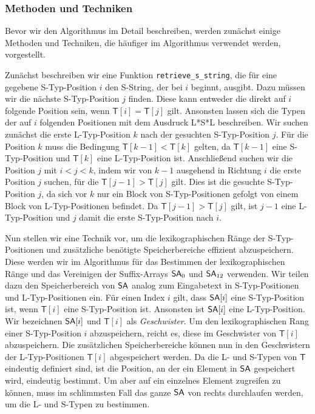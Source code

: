 \subsubsection{Methoden und Techniken}
\label{nzSufSort:intro:methods}

Bevor wir den Algorithmus im Detail beschreiben, werden zunächst einige Methoden und Techniken, die häufiger im Algorithmus verwendet werden, vorgestellt. \par
Zunächst beschreiben wir eine Funktion \texttt{retrieve\_s\_string}, die für eine gegebene S-Typ-Position $i$ den S-String, der bei $i$ beginnt, ausgibt. Dazu müssen wir die nächste S-Typ-Position $j$ finden. Diese kann entweder die direkt auf $i$ folgende Position sein, wenn $\mathsf{T}[i]=\mathsf{T}[j]$ gilt. Ansonsten lassen sich die Typen der auf $i$ folgenden Positionen mit dem Ausdruck L*S*L beschreiben. Wir suchen zunächst die erste L-Typ-Position $k$ nach der gesuchten S-Typ-Position $j$. Für die Position $k$ muss die Bedingung $\mathsf{T}[k-1] < \mathsf{T}[k]$ gelten, da $\mathsf{T}[k-1]$ eine S-Typ-Position und $\mathsf{T}[k]$ eine L-Typ-Position ist. Anschließend suchen wir die Position $j$ mit $i < j < k$, indem wir von $k-1$ ausgehend in Richtung $i$ die erste Position $j$ suchen, für die $\mathsf{T}[j-1] > \mathsf{T}[j]$ gilt. Dies ist die gesuchte S-Typ-Position $j$, da sich vor $k$ nur ein Block von S-Typ-Positionen gefolgt von einem Block von L-Typ-Positionen befindet. Da $\mathsf{T}[j-1] > \mathsf{T}[j]$ gilt, ist $j-1$ eine L-Typ-Position und $j$ damit die erste S-Typ-Position nach $i$. \par
Nun stellen wir eine Technik vor, um die lexikographischen Ränge der S-Typ-Positionen und zusätzliche benötigte Speicherbereiche effizient abzuspeichern. Diese werden wir im Algorithmus für das Bestimmen der lexikographischen Ränge und das Vereinigen der Suffix-Arrays $\sa_0$ und $\sa_{12}$ verwenden. Wir teilen dazu den Speicherbereich von $\sa$ analog zum Eingabetext in S-Typ-Positionen und L-Typ-Positionen ein. Für einen Index $i$ gilt, dass $\sa[i]$ eine S-Typ-Position ist, wenn $\mathsf{T}[i]$ eine S-Typ-Position ist. Ansonsten ist $\sa[i]$ eine L-Typ-Position. Wir bezeichnen $\sa[i]$ und $\mathsf{T}[i]$ als \textit{Geschwister}. Um den lexikographischen Rang einer S-Typ-Position $i$ abzuspeichern, reicht es, diese im Geschwister von $\mathsf{T}[i]$ abzuspeichern. Die zusätzlichen Speicherbereiche können nun in den Geschwistern der L-Typ-Positionen $\mathsf{T}[i]$ abgespeichert werden. Da die L- und S-Typen von $\mathsf{T}$ eindeutig definiert sind, ist die Position, an der ein Element in $\sa$ gespeichert wird, eindeutig bestimmt. Um aber auf ein einzelnes Element zugreifen zu können, muss im schlimmsten Fall das ganze $\sa$ von rechts durchlaufen werden, um die L- und S-Typen zu bestimmen.

